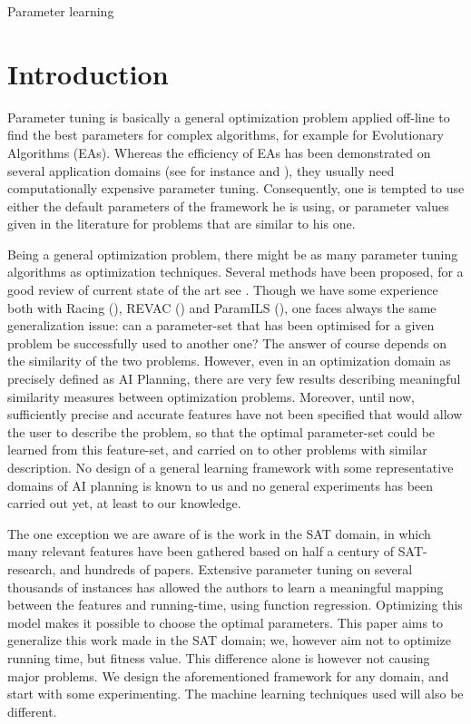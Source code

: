 \documentclass{acm_proc_article-sp}
\begin{document}
 {Parameter learning}





\section{Introduction}

Parameter tuning is basically a general optimization problem applied off-line to find the best parameters for complex algorithms, for example for Evolutionary Algorithms (EAs). Whereas the efficiency of EAs has been demonstrated on several application domains (see for instance \cite{practice08} and \cite{ParameterSettingBook07}), they usually need computationally expensive parameter tuning. Consequently, one is tempted to use either the default parameters of the framework he is using, or parameter values given in the literature for problems that are similar to his one. 

Being a general optimization problem, there might be as many parameter tuning algorithms as optimization techniques. Several methods have been proposed, for a good review of current state of the art see \cite{Montero:2010}. Though we have some experience both with Racing (\cite{bibai:2009}), REVAC (\cite{Nannen07}) and ParamILS (\cite{ParamILS-JAIR}), one faces always the same generalization issue: can a parameter-set that has been optimised for a given problem be successfully used to another one? The answer of course depends on the similarity of the two problems. However, even in an optimization domain as precisely defined as AI Planning, there are very few results describing meaningful similarity measures between optimization problems. Moreover, until now, sufficiently precise and accurate features have not been specified that would allow the user to describe the problem, so that the optimal parameter-set could be learned from this feature-set, and carried on to other problems with similar description. No design of a general learning framework with some representative domains of AI planning is known to us and no general experiments has been carried out yet, at least to our knowledge.

The one exception we are aware of is the work \cite{Hutter06} in the SAT domain, in which many relevant features have been gathered based on half a century of SAT-research, and hundreds of papers. Extensive parameter tuning on several thousands of instances has allowed the authors to learn a meaningful mapping between the features and running-time, using function regression. Optimizing this model makes it possible to choose the optimal parameters. This paper aims to generalize this work made in the SAT domain; we, however aim not to optimize running time, but fitness value. This difference alone is however not causing major problems. We design the aforementioned framework for any domain, and start with some experimenting. The machine learning techniques used will also be different.
\end{document}
